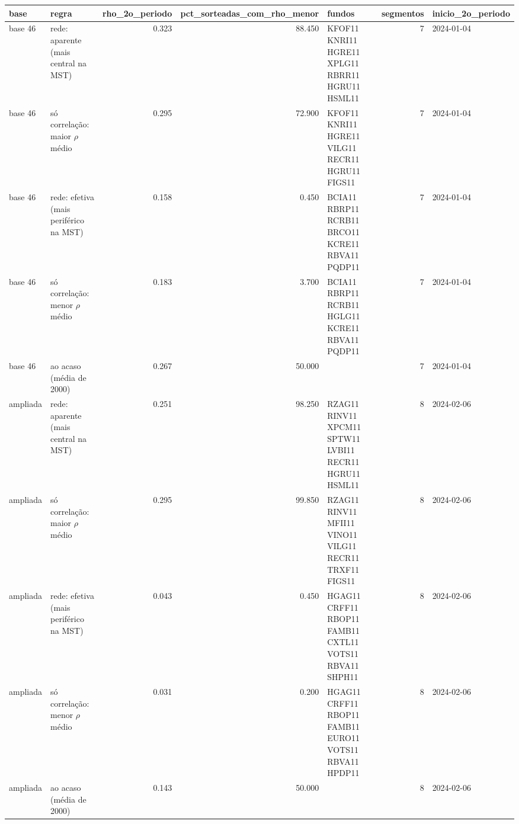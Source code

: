 \begin{tabular}{llrrlrl}
\toprule
base & regra & rho\_2o\_periodo & pct\_sorteadas\_com\_rho\_menor & fundos & segmentos & inicio\_2o\_periodo \\
\midrule
base 46 & rede: aparente (mais central na MST) & 0.323 & 88.450 & KFOF11 KNRI11 HGRE11 XPLG11 RBRR11 HGRU11 HSML11 & 7 & 2024-01-04 \\
base 46 & só correlação: maior $\rho$ médio & 0.295 & 72.900 & KFOF11 KNRI11 HGRE11 VILG11 RECR11 HGRU11 FIGS11 & 7 & 2024-01-04 \\
base 46 & rede: efetiva (mais periférico na MST) & 0.158 & 0.450 & BCIA11 RBRP11 RCRB11 BRCO11 KCRE11 RBVA11 PQDP11 & 7 & 2024-01-04 \\
base 46 & só correlação: menor $\rho$ médio & 0.183 & 3.700 & BCIA11 RBRP11 RCRB11 HGLG11 KCRE11 RBVA11 PQDP11 & 7 & 2024-01-04 \\
base 46 & ao acaso (média de 2000) & 0.267 & 50.000 &  & 7 & 2024-01-04 \\
ampliada & rede: aparente (mais central na MST) & 0.251 & 98.250 & RZAG11 RINV11 XPCM11 SPTW11 LVBI11 RECR11 HGRU11 HSML11 & 8 & 2024-02-06 \\
ampliada & só correlação: maior $\rho$ médio & 0.295 & 99.850 & RZAG11 RINV11 MFII11 VINO11 VILG11 RECR11 TRXF11 FIGS11 & 8 & 2024-02-06 \\
ampliada & rede: efetiva (mais periférico na MST) & 0.043 & 0.450 & HGAG11 CRFF11 RBOP11 FAMB11 CXTL11 VOTS11 RBVA11 SHPH11 & 8 & 2024-02-06 \\
ampliada & só correlação: menor $\rho$ médio & 0.031 & 0.200 & HGAG11 CRFF11 RBOP11 FAMB11 EURO11 VOTS11 RBVA11 HPDP11 & 8 & 2024-02-06 \\
ampliada & ao acaso (média de 2000) & 0.143 & 50.000 &  & 8 & 2024-02-06 \\
\bottomrule
\end{tabular}
